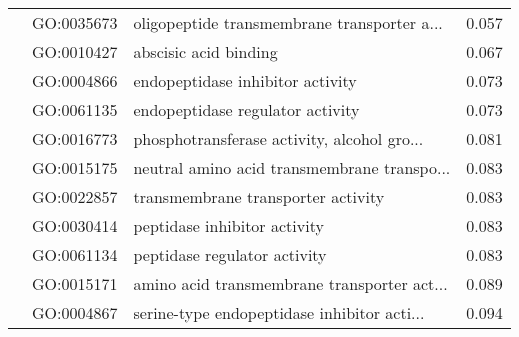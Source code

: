 \begin{longtable}{lllr}
   & GO:0035673 &  oligopeptide transmembrane transporter a... &         0.057 \\
   & GO:0010427 &                        abscisic acid binding &         0.067 \\
   & GO:0004866 &             endopeptidase inhibitor activity &         0.073 \\
   & GO:0061135 &             endopeptidase regulator activity &         0.073 \\
   & GO:0016773 &  phosphotransferase activity, alcohol gro... &         0.081 \\
   & GO:0015175 &  neutral amino acid transmembrane transpo... &         0.083 \\
   & GO:0022857 &           transmembrane transporter activity &         0.083 \\
   & GO:0030414 &                 peptidase inhibitor activity &         0.083 \\
   & GO:0061134 &                 peptidase regulator activity &         0.083 \\
   & GO:0015171 &  amino acid transmembrane transporter act... &         0.089 \\
   & GO:0004867 &  serine-type endopeptidase inhibitor acti... &         0.094 \\
\end{longtable}
